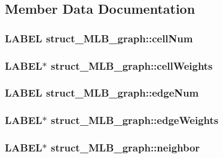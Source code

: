 \subsection{Member Data Documentation}
\hypertarget{structstruct__MLB__graph_ae3744293c04d9748ae6e3072721f4aad}{
\subsubsection[{cellNum}]{\setlength{\rightskip}{0pt plus 5cm}LABEL {\bf struct\_\-MLB\_\-graph::cellNum}}}
\label{structstruct__MLB__graph_ae3744293c04d9748ae6e3072721f4aad}
\hypertarget{structstruct__MLB__graph_ab0d8599c1eddf6e226a1f8d932acdaa9}{
\subsubsection[{cellWeights}]{\setlength{\rightskip}{0pt plus 5cm}LABEL$\ast$ {\bf struct\_\-MLB\_\-graph::cellWeights}}}
\label{structstruct__MLB__graph_ab0d8599c1eddf6e226a1f8d932acdaa9}
\hypertarget{structstruct__MLB__graph_a6073161bbd907d86c2de319af24cbcc5}{
\subsubsection[{edgeNum}]{\setlength{\rightskip}{0pt plus 5cm}LABEL {\bf struct\_\-MLB\_\-graph::edgeNum}}}
\label{structstruct__MLB__graph_a6073161bbd907d86c2de319af24cbcc5}
\hypertarget{structstruct__MLB__graph_a39be8b4a7c4cfb06f1e0abb7ec78a7e3}{
\subsubsection[{edgeWeights}]{\setlength{\rightskip}{0pt plus 5cm}LABEL$\ast$ {\bf struct\_\-MLB\_\-graph::edgeWeights}}}
\label{structstruct__MLB__graph_a39be8b4a7c4cfb06f1e0abb7ec78a7e3}
\hypertarget{structstruct__MLB__graph_a7eb36bae724d139d7fc21d94e6199cfc}{
\subsubsection[{neighbor}]{\setlength{\rightskip}{0pt plus 5cm}LABEL$\ast$ {\bf struct\_\-MLB\_\-graph::neighbor}}}
